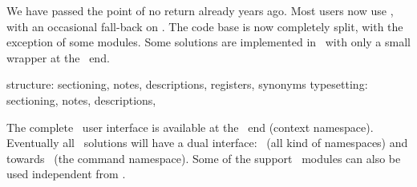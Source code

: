 

 {}

\startdocument
  [title=Finding\par the\par balance]


\startsubject[title={No way back}]

\StartSteps

\startitemize
\startitem We have passed the point of no return already years ago. \stopitem \FlushStep
\startitem Most users now use \MKIV, with an occasional fall-back on \MKII. \stopitem \FlushStep
\startitem The code base is now completely split, with the exception of some modules. \stopitem \FlushStep
\startitem Some solutions are implemented in \LUA\ with only a small wrapper at the \TEX\ end. \stopitem \FlushStep
\stopitemize

\StopSteps

\stopsubject

\startsubject[title={To get an idea}]

\StartSteps

\startitemize
\startitem structure: sectioning, notes, descriptions, registers, synonyms \stopitem \FlushStep
\startitem typesetting: sectioning, notes, descriptions, \stopitem \FlushStep
\stopitemize

\StopSteps

\stopsubject

\startsubject[title={Hybrid coding}]

\StartSteps

\startitemize
\startitem The complete \CONTEXT\ user interface is available at the \LUA\ end (context namespace). \stopitem \FlushStep
\startitem Eventually all \LUA\ solutions will have a dual interface: \LUA\ (all kind of namespaces) and
towards \TEX\ (the command namespace). \stopitem \FlushStep
\startitem Some of the support \LUA\ modules can also be used independent from \CONTEXT. \stopitem \FlushStep
\stopitemize

\StopSteps \StopPage

\startsubject[title={Coding in \TEX}]

\StartSteps

